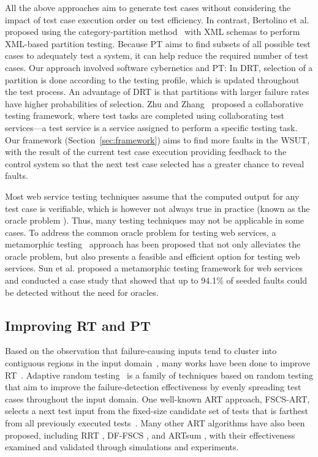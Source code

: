 \documentclass[10pt,journal,compsoc]{IEEEtran}
\begin{document}
All the above approaches aim to generate test cases without considering the impact of test case execution order on test efficiency.
In contrast, Bertolino et al.~\cite{bertolino2007automatic} proposed using the category-partition method~\cite{Ostrand88} with XML schemas to perform XML-based partition testing.
Because PT aims to find subsets of all possible test cases to adequately test a system, it can help reduce the required number of test cases.
Our approach involved software cybernetics and PT:
In DRT, selection of a partition is done according to the testing profile, which is updated throughout the test process.
An advantage of DRT is that partitions with larger failure rates have higher probabilities of selection.
Zhu and Zhang~\cite{zhu2012collaborative} proposed a collaborative testing framework, where test tasks are completed using collaborating test services---a test service is a service assigned to perform a specific testing task.
Our framework (Section~\ref{sec:framework}) aims to find more faults in the WSUT, with the result of the current test case execution providing feedback to the control system so that the next test case selected has a greater chance to reveal faults.

Most web service testing techniques assume that the computed output for any test case is verifiable, which is however not always true in practice (known as the oracle problem \cite{barr2015oracle, patel2018mapping}). Thus, many testing techniques may not be applicable in some cases.
To address the common oracle problem for testing web services, a metamorphic testing~\cite{chen1998metamorphic,chen2018metamorphic} approach has been proposed that not only alleviates the oracle problem, but also presents a feasible and efficient option for testing web services.
Sun et al. proposed a metamorphic testing framework for web services~\cite{sun2011} and conducted a case study that showed that up to 94.1\% of seeded faults could be detected without the need for oracles.

\subsection{Improving RT and PT}
\label{sec:relatedworkRT}

Based on the observation that failure-causing inputs tend to cluster into contiguous regions in the input domain~\cite{Ammann88, Finelli91}, many works have been done to improve RT~\cite{cai2009random, chen2010adaptive}.
Adaptive random testing~\cite{chen2010adaptive} is a family of techniques based on random testing that aim to improve the failure-detection effectiveness by evenly spreading test cases throughout the input domain.
One well-known ART approach, FSCS-ART, selects a next test input from the fixed-size candidate set of tests that is farthest from all previously executed tests~\cite{chen2004adaptive}.
Many other ART algorithms have also been proposed, including RRT \cite{chan2002restricted, chan2006restricted}, DF-FSCS \cite{mao2017out}, and ARTsum \cite{barus2016cost}, with their effectiveness examined and  validated through simulations and experiments.
\end{document}
